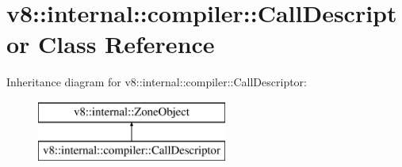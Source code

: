 \hypertarget{classv8_1_1internal_1_1compiler_1_1_call_descriptor}{}\section{v8\+:\+:internal\+:\+:compiler\+:\+:Call\+Descriptor Class Reference}
\label{classv8_1_1internal_1_1compiler_1_1_call_descriptor}
Inheritance diagram for v8\+:\+:internal\+:\+:compiler\+:\+:Call\+Descriptor\+:\begin{figure}[H]
\begin{center}
\leavevmode
\includegraphics[height=2.000000cm]{classv8_1_1internal_1_1compiler_1_1_call_descriptor}
\end{center}
\end{figure}
